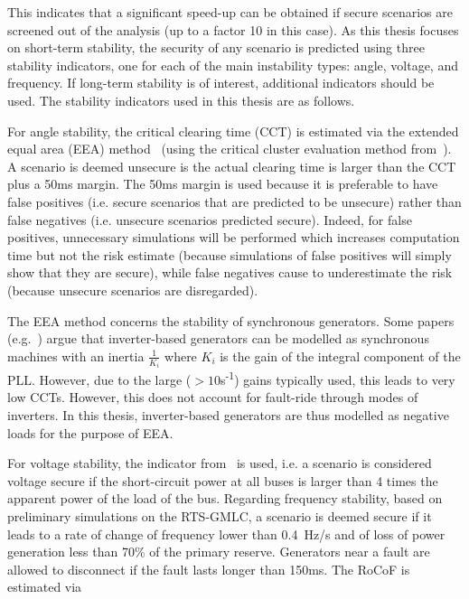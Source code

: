 This indicates that a significant speed-up can be obtained if secure scenarios are screened out of the analysis (up to a factor 10 in this case). As this thesis focuses on short-term stability, the security of any scenario is predicted using three stability indicators, one for each of the main instability types: angle, voltage, and frequency. If long-term stability is of interest, additional indicators should be used. The stability indicators used in this thesis are as follows.

For angle stability, the critical clearing time (CCT) is estimated via the extended equal area (EEA) method~\cite{EqualAreaCriterionEnergies} (using the critical cluster evaluation method from~\cite{EqualAreaCriterionPSCC}). A scenario is deemed unsecure is the actual clearing time is larger than the CCT plus a 50ms margin. The 50ms margin is used because it is preferable to have false positives (i.e. secure scenarios that are predicted to be unsecure) rather than false negatives (i.e. unsecure scenarios predicted secure). Indeed, for false positives, unnecessary simulations will be performed which increases computation time but not the risk estimate (because simulations of false positives will simply show that they are secure), while false negatives cause to underestimate the risk (because unsecure scenarios are disregarded).

The EEA method concerns the stability of synchronous generators. Some papers (e.g.~\cite{ScreeningPLL}) argue that inverter-based generators can be modelled as synchronous machines with an inertia \(\frac{1}{K_i}\) where \(K_i\) is the gain of the integral component of the PLL. However, due to the large (\(>10\)s\textsuperscript{-1}) gains typically used, this leads to very low CCTs. However, this does not account for fault-ride through modes of inverters. In this thesis, inverter-based generators are thus modelled as negative loads for the purpose of EEA.

For voltage stability, the indicator from~\cite{VoltageScreeningMachowski} is used, i.e. a scenario is considered voltage secure if the short-circuit power at all buses is larger than 4 times the apparent power of the load of the bus. Regarding frequency stability, based on preliminary simulations on the RTS-GMLC, a scenario is deemed secure if it leads to a rate of change of frequency lower than 0.4~Hz/s and of loss of power generation less than 70\% of the primary reserve. Generators near a fault are allowed to disconnect if the fault lasts longer than 150ms. The RoCoF is estimated via

